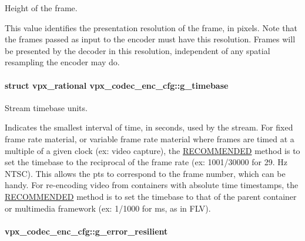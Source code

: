 \-Height of the frame. 

\-This value identifies the presentation resolution of the frame, in pixels. \-Note that the frames passed as input to the encoder must have this resolution. \-Frames will be presented by the decoder in this resolution, independent of any spatial resampling the encoder may do. \hypertarget{structvpx__codec__enc__cfg_a6498d378e4c29ef3e22258289e481087}{
\paragraph[{g\-\_\-timebase}]{\setlength{\rightskip}{0pt plus 5cm}struct {\bf vpx\-\_\-rational} {\bf vpx\-\_\-codec\-\_\-enc\-\_\-cfg\-::g\-\_\-timebase}}}
\label{structvpx__codec__enc__cfg_a6498d378e4c29ef3e22258289e481087}


\-Stream timebase units. 

\-Indicates the smallest interval of time, in seconds, used by the stream. \-For fixed frame rate material, or variable frame rate material where frames are timed at a multiple of a given clock (ex\-: video capture), the \hyperlink{rfc2119_RECOMMENDED}{\-R\-E\-C\-O\-M\-M\-E\-N\-D\-E\-D} method is to set the timebase to the reciprocal of the frame rate (ex\-: 1001/30000 for 29. \-Hz \-N\-T\-S\-C). \-This allows the pts to correspond to the frame number, which can be handy. \-For re-\/encoding video from containers with absolute time timestamps, the \hyperlink{rfc2119_RECOMMENDED}{\-R\-E\-C\-O\-M\-M\-E\-N\-D\-E\-D} method is to set the timebase to that of the parent container or multimedia framework (ex\-: 1/1000 for ms, as in \-F\-L\-V). \hypertarget{structvpx__codec__enc__cfg_a4e17173b66ca0d7dfba9978625d7ba76}{
\paragraph[{g\-\_\-error\-\_\-resilient}]{ {\bf vpx\-\_\-codec\-\_\-enc\-\_\-cfg\-::g\-\_\-error\-\_\-resilient}}}
\label{structvpx__codec__enc__cfg_a4e17173b66ca0d7dfba9978625d7ba76}


